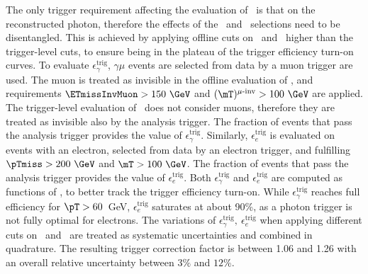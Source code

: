 
The only trigger requirement affecting the evaluation of \fey\ is that on the reconstructed photon, therefore the effects of the \pTmiss\ and \mT\ selections need to be disentangled.
This is achieved by applying offline cuts on \pTmiss\ and \mT\ higher than the trigger-level cuts, to ensure being in the plateau of the trigger efficiency turn-on curves. 
To evaluate $\epsilon_\gamma^\mathrm{trig}$, $\gamma\mu$ events are selected from data by a muon trigger are used. The muon is treated as invisible in the offline evaluation of \pTmiss, and requirements $\ETmissInvMuon>150~\GeV$ and $(\mT)^{\mu\textrm{-inv}}>100~\GeV$ are applied. The trigger-level evaluation of \pTmiss\ does not consider muons, therefore they are treated as invisible also by the analysis trigger. The fraction of events that pass the analysis trigger provides the value of $\epsilon_\gamma^\mathrm{trig}$.
Similarly, $\epsilon_e^\mathrm{trig}$ is evaluated on events with an electron, selected from data by an electron trigger, and fulfilling $\pTmiss>200~\GeV$ and $\mT>100~\GeV$. The fraction of events that pass the analysis trigger provides the value of $\epsilon_e^\mathrm{trig}$.
Both $\epsilon_\gamma^\mathrm{trig}$ and $\epsilon_e^\mathrm{trig}$ are computed as functions of \pT, to better track the trigger efficiency turn-on. While $\epsilon_\gamma^\mathrm{trig}$ reaches full efficiency for $\pT>60$~GeV, $\epsilon_e^\mathrm{trig}$ saturates at about 90\%, as a photon trigger is not fully optimal for electrons.
The variations of 
$\epsilon_\gamma^\mathrm{trig},~\epsilon_e^\mathrm{trig}$ when applying different cuts on \pTmiss\ and \mT\ are treated as systematic uncertainties and combined in quadrature. The resulting trigger correction factor is between 1.06 and 1.26 with an overall relative uncertainty between $3\%$ and $12\%$.

